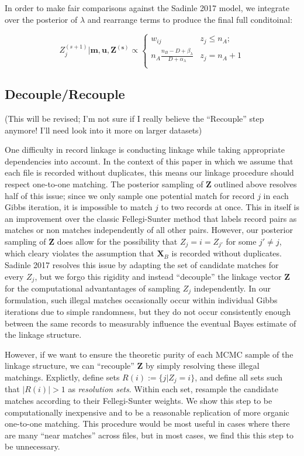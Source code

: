 \documentclass[
  12pt,
]{article}
\begin{document}
In order to make fair comparisons against the Sadinle 2017 model, we
integrate over the posterior of \(\lambda\) and rearrange terms to
produce the final full conditoinal:

\[Z_j^{(s+1)} | \mathbf{m}, \mathbf{u}, \mathbf{Z^{(s)}} \propto
\begin{cases} 
    w_{ij}  & z_j \leq n_A; \\
     n_A \frac{n_B - D + \beta_{\lambda}}{D + \alpha_{\lambda}} &  z_j  = n_A + 1 \\
\end{cases}\]

\hypertarget{decouplerecouple}{%
\subsection{Decouple/Recouple}\label{decouplerecouple}}

(This will be revised; I'm not sure if I really believe the ``Recouple''
step anymore! I'll need look into it more on larger datasets)

One difficulty in record linkage is conducting linkage while taking
appropriate dependencies into account. In the context of this paper in
which we assume that each file is recorded without duplicates, this
means our linkage procedure should respect one-to-one matching. The
posterior sampling of \(\mathbf{Z}\) outlined above resolves half of
this issue; since we only sample one potential match for record \(j\) in
each Gibbs iteration, it is impossible to match \(j\) to two records at
once. This in itself is an improvement over the classic Fellegi-Sunter
method that labels record pairs as matches or non matches independently
of all other pairs. However, our posterior sampling of \(\mathbf{Z}\)
does allow for the possibility that \(Z_j = i = Z_{j'}\) for some
\(j' \neq j\), which cleary violates the assumption that
\(\mathbf{X}_B\) is recorded without duplicates. Sadinle 2017 resolves
this issue by adapting the set of candidate matches for every \(Z_j\),
but we forgo this rigidity and instead ``decouple'' the linkage vector
\(\mathbf{Z}\) for the computational advantantages of sampling \(Z_j\)
independently. In our formulation, such illegal matches occasionally
occur within individual Gibbs iterations due to simple randomness, but
they do not occur consistently enough between the same records to
measurably influence the eventual Bayes estimate of the linkage
structure.

However, if we want to ensure the theoretic purity of each MCMC sample
of the linkage structure, we can ``recouple'' \(\mathbf{Z}\) by simply
resolving these illegal matchings. Explictly, define sets
\(R(i) := \{j | Z_j = i\}\), and define all sets such that
\(|R(i)| > 1\) as \emph{resolution sets}. Within each set, resample the
candidate matches according to their Fellegi-Sunter weights. We show
this step to be computationally inexpensive and to be a reasonable
replication of more organic one-to-one matching. This procedure would be
most useful in cases where there are many ``near matches'' across files,
but in most cases, we find this this step to be unnecessary.
\end{document}
